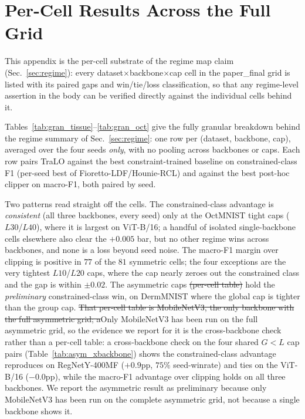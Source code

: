 \documentclass[10pt]{article}
\newcommand{\del}[1]{{\color{red}\sout{#1}}}
\begin{document}
\section{Per-Cell Results Across the Full Grid}
\label{app:regime}

This appendix is the per-cell substrate of the regime map claim
(Sec.~\ref{sec:regime}): every dataset$\times$backbone$\times$cap cell in
the paper\_final grid is listed with its paired gaps and win/tie/loss
classification, so that any regime-level assertion in the body can be
verified directly against the individual cells behind it.

Tables~\ref{tab:gran_tissue}--\ref{tab:gran_oct} give the fully granular
breakdown behind the regime summary of Sec.~\ref{sec:regime}: one row
per (dataset, backbone, cap), averaged over the four seeds \emph{only},
with no pooling across backbones or caps. Each row pairs TraLO against
the best constraint-trained baseline on constrained-class F1 (per-seed
best of Fioretto-LDF/Hounie-RCL) and against the best post-hoc clipper
on macro-F1, both paired by seed.

Two patterns read straight off the cells. The constrained-class
advantage is \emph{consistent} (all three backbones, every seed) only
at the OctMNIST tight caps ($L30$/$L40$), where it is largest on
ViT-B/16; a handful of isolated single-backbone cells elsewhere also
clear the $+0.005$ bar, but no other regime wins across backbones, and
none is a loss beyond seed noise. The macro-F1 margin over clipping is
positive in $77$ of the $81$ symmetric cells; the four exceptions are
the very tightest $L10$/$L20$ caps, where the cap nearly zeroes out the
constrained class and the gap is within $\pm0.02$. The asymmetric caps
\del{(per-cell table)} hold the \emph{preliminary}
constrained-class win, on DermMNIST where the global cap is tighter
than the group cap. \del{That per-cell table is MobileNetV3, the only
backbone with the full asymmetric grid; a}{\color{blue}Only MobileNetV3 has been
run on the full asymmetric grid, so the evidence we report for it is the
cross-backbone check rather than a per-cell table: a} cross-backbone check on the
four shared $G{<}L$ cap pairs (Table~\ref{tab:asym_xbackbone}) shows
the constrained-class advantage reproduces on RegNet{\color{blue}Y-400MF} ($+0.9$pp, $75\%$
seed-winrate) and ties on the ViT{\color{blue}-B/16} ($-0.0$pp), while the macro-F1
advantage over clipping holds on all three backbones. We report the
asymmetric result as preliminary because only MobileNetV3 has been run
on the complete asymmetric grid, not because a single backbone shows it.
\end{document}
